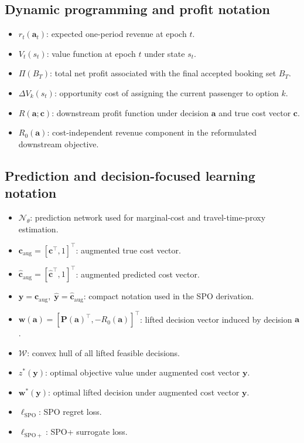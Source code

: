 \documentclass[preprint,12pt,authoryear]{elsarticle}
\begin{document}
\subsection{Dynamic programming and profit notation}

\begin{itemize}
\item $r_t(\mathbf{a}_t)$: expected one-period revenue at epoch $t$.
\item $V_t(s_t)$: value function at epoch $t$ under state $s_t$.
\item $\Pi(B_T)$: total net profit associated with the final accepted booking set $B_T$.
\item $\Delta V_k(s_t)$: opportunity cost of assigning the current passenger to option $k$.
\item $R(\mathbf{a};\mathbf{c})$: downstream profit function under decision $\mathbf{a}$ and true cost vector $\mathbf{c}$.
\item $R_0(\mathbf{a})$: cost-independent revenue component in the reformulated downstream objective.
\end{itemize}

\subsection{Prediction and decision-focused learning notation}

\begin{itemize}
\item $\mathcal{N}_{\theta}$: prediction network used for marginal-cost and travel-time-proxy estimation.
\item $\mathbf{c}_{\mathrm{aug}}=[\mathbf{c}^{\top},1]^{\top}$: augmented true cost vector.
\item $\hat{\mathbf{c}}_{\mathrm{aug}}=[\hat{\mathbf{c}}^{\top},1]^{\top}$: augmented predicted cost vector.
\item $\mathbf{y} = \mathbf{c}_{\mathrm{aug}},\; \hat{\mathbf{y}} = \hat{\mathbf{c}}_{\mathrm{aug}}$: compact notation used in the SPO derivation.
\item $\mathbf{w}(\mathbf{a})=[\mathbf{P}(\mathbf{a})^{\top},-R_0(\mathbf{a})]^{\top}$: lifted decision vector induced by decision $\mathbf{a}$.
\item $\mathcal{W}$: convex hull of all lifted feasible decisions.
\item $z^{*}(\mathbf{y})$: optimal objective value under augmented cost vector $\mathbf{y}$.
\item $\mathbf{w}^{*}(\mathbf{y})$: optimal lifted decision under augmented cost vector $\mathbf{y}$.
\item $\ell_{\mathrm{SPO}}$: SPO regret loss.
\item $\ell_{\mathrm{SPO}+}$: SPO+ surrogate loss.
\end{itemize}
\end{document}
